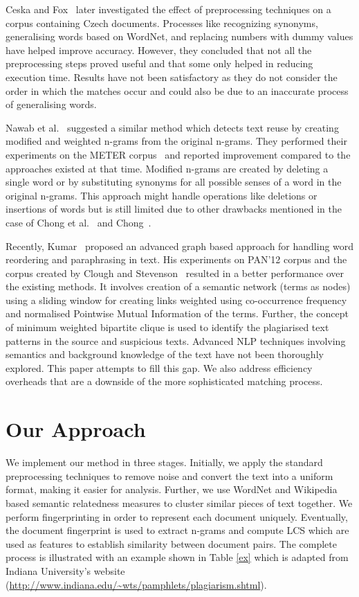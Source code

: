\documentclass[11pt]{article}
\begin{document}
Ceska and Fox~ later investigated the effect of preprocessing techniques on a corpus containing Czech documents. Processes like recognizing synonyms, generalising words based on WordNet, and replacing numbers with dummy values have helped improve accuracy. However, they concluded that not all the preprocessing steps proved useful and that some only helped in reducing execution time. Results have not been satisfactory as they do not consider the order in which the matches occur and could also be due to an inaccurate process of generalising words.

Nawab et al.~ suggested a similar method which detects text reuse by creating modified and weighted n-grams from the original n-grams. They performed their experiments on the METER corpus~\cite{gai:01} and reported improvement compared to the approaches existed at that time. Modified n-grams are created by deleting a single word or by substituting synonyms for all possible senses of a word in the original n-grams. This approach might handle operations like deletions or insertions of words but is still limited due to other drawbacks mentioned in the case of Chong et al.~ and Chong~.

Recently, Kumar~ proposed an advanced graph based approach for handling word reordering and paraphrasing in text. His experiments on PAN'12 corpus and the corpus created by Clough and Stevenson~ resulted in a better performance over the existing methods. It involves creation of a semantic network (terms as nodes) using a sliding window for creating links weighted using co-occurrence frequency and normalised Pointwise Mutual Information of the terms. Further, the concept of minimum weighted bipartite clique is used to identify the plagiarised text patterns in the source and suspicious texts. Advanced NLP techniques involving semantics and background knowledge of the text have not been thoroughly explored. This paper attempts to fill this gap. We also address efficiency overheads that are a downside of the more sophisticated matching process.

\section{Our Approach}\label{3}
We implement our method in three stages. Initially, we apply the standard preprocessing techniques to remove noise and convert the text into a uniform format, making it easier for analysis. Further, we use WordNet and Wikipedia based semantic relatedness measures to cluster similar pieces of text together. We perform fingerprinting in order to represent each document uniquely. Eventually, the document fingerprint is used to extract n-grams and compute LCS which are used as features to establish similarity between document pairs. The complete process is illustrated with an example shown in Table \ref{ex} which is adapted from Indiana University's website (\url{http://www.indiana.edu/~wts/pamphlets/plagiarism.shtml}).
\end{document}
